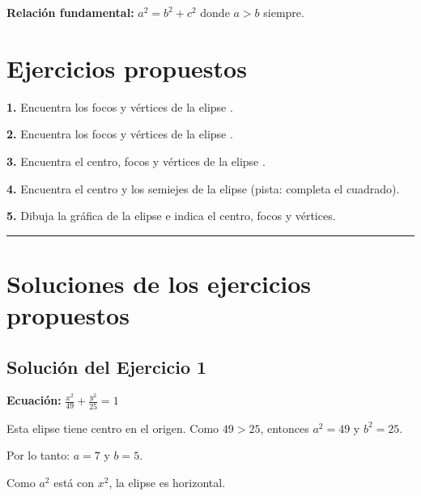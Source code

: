 \documentclass[12pt,a4paper]{article}
\begin{document}
	\bigskip

	\textbf{Relación fundamental:} $\boxed{a^2=b^2+c^2}$ donde $a>b$ siempre.

	\section{Ejercicios propuestos}

	\textbf{1.} Encuentra los focos y vértices de la elipse {}.

	\bigskip

	\textbf{2.} Encuentra los focos y vértices de la elipse {}.

	\bigskip

	\textbf{3.} Encuentra el centro, focos y vértices de la elipse {}.

	\bigskip

	\textbf{4.} Encuentra el centro y los semiejes de la elipse {\color{red}{$9x^2+4y^2-18x+16y-11=0$}} (pista: completa el cuadrado).

	\bigskip

	\textbf{5.} Dibuja la gráfica de la elipse {} e indica el centro, focos y vértices.

	\bigskip
	\bigskip

	\hrule

	\bigskip
	\bigskip

	\section{Soluciones de los ejercicios propuestos}

	\subsection*{Solución del Ejercicio 1}

	\textbf{Ecuación:} $\displaystyle\frac{x^2}{49}+\frac{y^2}{25}=1$

	\bigskip

	Esta elipse tiene centro en el origen. Como $49>25$, entonces $a^2=49$ y $b^2=25$.

	\bigskip

	Por lo tanto: $a=7$ y $b=5$.

	\bigskip

	Como $a^2$ está con $x^2$, la elipse es horizontal.
\end{document}
